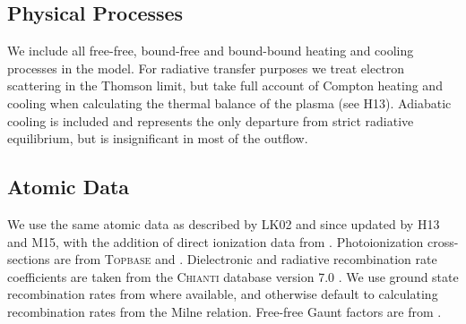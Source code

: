 \documentclass[useAMS,usenatbib]{mn2e_x}
\begin{document}
\subsection{Physical Processes}

We include all free-free, bound-free and bound-bound heating
and cooling processes in the model. For radiative transfer purposes
we treat electron scattering in the Thomson limit, 
but take full account of Compton heating and cooling when
calculating the thermal balance of the plasma (see H13).
Adiabatic cooling is included and represents the only
departure from strict radiative equilibrium, but is insignificant 
in most of the outflow.



\subsection{Atomic Data}

We use the same atomic data as described by LK02 and since updated by H13 and M15, 
with the addition of direct ionization data from \cite{dere2007}. 
Photoionization cross-sections are from \textsc{Topbase} \citep{cunto1993} and  \cite{vfky}.
Dielectronic and radiative recombination rate coefficients are taken from 
the \textsc{Chianti} database version 7.0 \citep{dere1997,landi2012}.
We use ground state recombination rates from \cite{badnell2006} where available,
and otherwise default to calculating recombination rates from the Milne
relation. Free-free Gaunt factors are from \cite{sutherland1998}.
\end{document}
